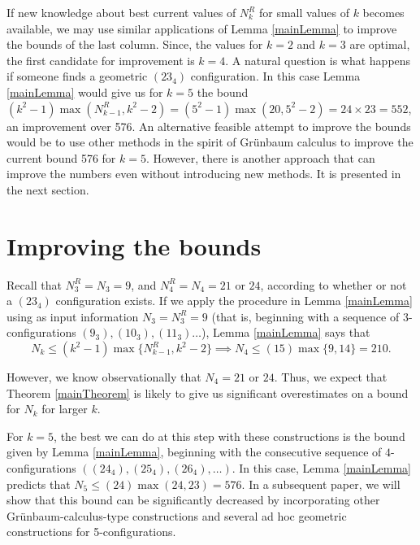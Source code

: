 \documentclass[reqno,12pt]{amsart}
\theoremstyle{plain}
\theoremstyle{definition}
\theoremstyle{remark}
\begin{document}
If new knowledge about best current values of $N^R_k$ for small values of $k$ becomes available, we may use similar applications of  
Lemma \ref{mainLemma} to improve the bounds of the last column. Since, the values for $k=2$ and $k=3$ are optimal, the first candidate 
for improvement is $k = 4$. A natural question is what happens if someone finds a geometric $(23_4)$ configuration. In this case Lemma 
\ref{mainLemma} would give us for $k = 5$ the bound $(k^2-1)\max(N^{R}_{k-1},k^2-2) = (5^2-1)\max(20,5^2-2) = 24 \times 23 = 552$, 
an improvement over 576. An alternative feasible attempt to improve the bounds would be to use other methods in the spirit of Gr\"unbaum 
calculus to improve the current bound 576 for $k=5$. However, there is another approach that can improve the numbers even without 
introducing new methods. It is presented in the next section.


\section{Improving the bounds}


Recall that $N^{R}_{3} = N_{3} = 9$, and $N^{R}_{4} = N_{4} = 21$ or $24$, according to whether or not a 
$(23_{4})$ configuration exists. If we apply the procedure in Lemma \ref{mainLemma} using as input information 
$N_{3} = N^{R}_{3} = 9$ (that is, beginning with a sequence of $3$-configurations $(9_{3}), (10_{3}), (11_{3}) \ldots$), 
Lemma \ref{mainLemma} says that 
\[ N_{k}\leq (k^{2}-1)\max\{N^{R}_{k-1},k^{2} - 2\} \implies N_{4} \leq (15)\max\{9, 14\} = 210. \]

However, we know observationally that $N_{4} = 21$ or $24$. Thus, we expect that Theorem \ref{mainTheorem} 
is likely to give us significant overestimates on a bound for $N_{k}$ for larger $k$.

For $k = 5$, the best we can do at this step with these constructions is the bound given by Lemma \ref{mainLemma}, 
beginning with the consecutive sequence of $4$-configurations $((24_{4}), (25_{4}), (26_{4}), \ldots)$.
%
In this case, Lemma \ref{mainLemma} predicts that 
$N_{5} \leq (24)\max(24, 23) = 576.$
In a subsequent paper, we will show that this bound can be significantly decreased by incorporating other Gr\"unbaum-calculus-type constructions 
and several ad hoc geometric constructions for 5-configurations.
\end{document}
